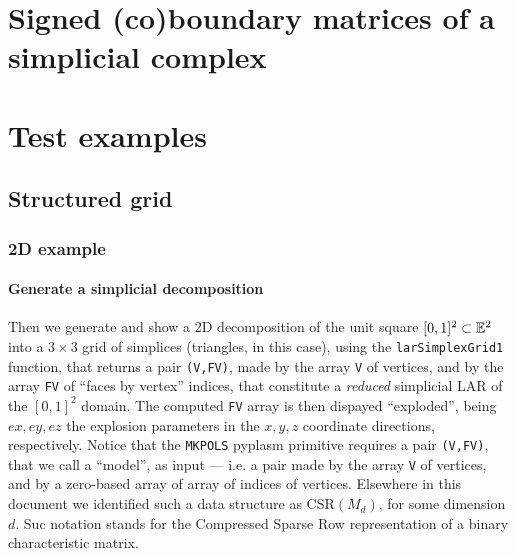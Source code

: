 \documentclass[11pt,oneside]{article}	%
\begin{document}
\section{Signed (co)boundary matrices of a simplicial complex}
\label{simplicial}

\section{Test examples}

\subsection{Structured grid}

\subsubsection{2D example}

\paragraph{Generate a simplicial decomposition}
Then we generate and show a 2D decomposition of the unit square $[0,1]^2\subset\mathbb{E}^2$ into a $3\times 3$ grid of simplices (triangles, in this case), using the \texttt{larSimplexGrid1} function, that returns a pair \texttt{(V,FV)}, made by the array \texttt{V} of vertices, and by the array \texttt{FV} of ``faces by vertex'' indices, that constitute a \emph{reduced} simplicial LAR of the $[0,1]^2$ domain. The computed \texttt{FV} array is then dispayed ``exploded'', being $ex,ey,ez$ the explosion parameters in the $x,y,z$ coordinate directions, respectively. Notice that the \texttt{MKPOLS} pyplasm primitive requires a pair \texttt{(V,FV)}, that we call a ``model'', as input --- i.e. a pair made by the array \texttt{V} of vertices, and by a zero-based array of array of indices of vertices. Elsewhere in this document we identified such a data structure as CSR$(M_d)$, for some dimension $d$. Suc notation stands for the Compressed Sparse Row representation of a binary characteristic matrix.
\end{document}
